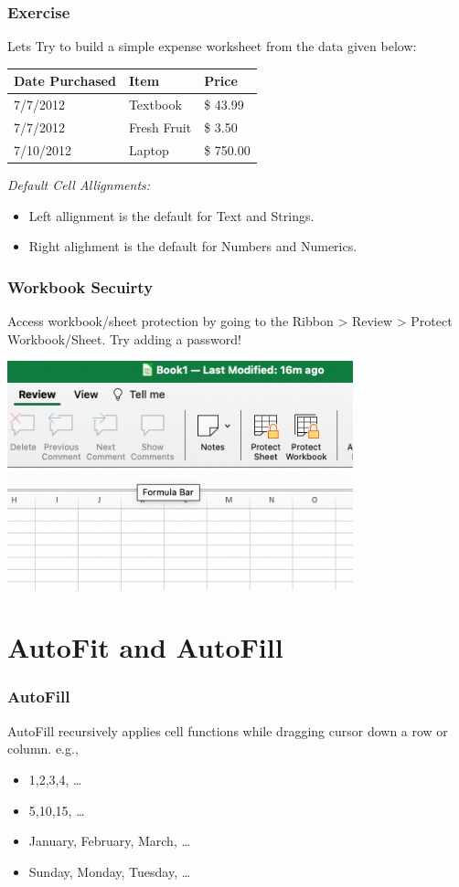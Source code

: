\documentclass[12pt]{beamer}
\begin{document}
	\begin{frame}
		\frametitle{Exercise}
		Lets Try to build a simple expense worksheet from the data given below:\\
		\begin{center}
			\begin{tabular}{ |l|l|l|}
				\hline
				Date Purchased & Item & Price\\
				\hline
				7/7/2012 & Textbook  & \$ 43.99\\
				7/7/2012 & Fresh Fruit& \$ 3.50 \\
				7/10/2012 & Laptop & \$ 750.00\\
				\hline
			\end{tabular}
		\end{center}
	\bigskip
	\textit{Default Cell Allignments:}
	\begin{itemize}
		\item Left allignment is the default for Text and Strings.
		\item Right alighment is the default for Numbers and Numerics.
	\end{itemize}
	\end{frame}
	\begin{frame}
		\frametitle{Workbook Secuirty}
			Access workbook/sheet protection by going to the Ribbon > Review > Protect Workbook/Sheet. 
			Try adding a password!
			\begin{center}
				\includegraphics[width=10cm]{protectWorkbook.png}
			\end{center}
	\end{frame}
	\section{AutoFit and AutoFill}
	\begin{frame}
		\frametitle{AutoFill}
		AutoFill recursively applies cell functions while dragging cursor down a row or column. e.g., 
		\begin{itemize}
			\item 1,2,3,4, \ldots
			\item 5,10,15, \ldots
			\item January, February, March, \ldots
			\item Sunday, Monday, Tuesday, \ldots
		\end{itemize}
	\end{frame}
\end{document}
